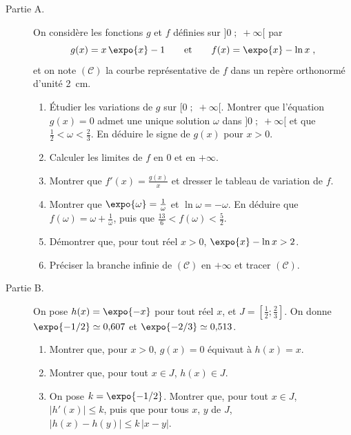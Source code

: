 \begin{exo}
\label{exo:el exp moins ln}
      \begin{description}
            \item[Partie A.]
                On consid\`ere les fonctions $g$ et $f$ d\'efinies sur $]0 \; ; \; +\infty[$ par
                \[ g(x) = x\,\expo{x} - 1 \qquad \text{et} \qquad f(x) = \expo{x} - \ln x \;, \]
                et on note $(\mathcal{C})$ la courbe repr\'esentative de $f$ dans un rep\`ere orthonorm\'e d'unit\'e 2~cm.
                \begin{enumerate}
                \item \'Etudier les variations de $g$ sur $[0 \; ; \; +\infty[$. Montrer que l'\'equation $g(x) = 0$ admet
                      une unique solution $\omega$ dans $]0 \; ; \; +\infty[$ et que $\frac{1}{2} < \omega < \frac{2}{3}$.
                      En d\'eduire le signe de $g(x)$ pour $x > 0$.
                \item Calculer les limites de $f$ en $0$ et en $+\infty$.
                \item Montrer que $f'(x) = \frac{g(x)}{x}$ et dresser le tableau de variation de $f$.
                \item Montrer que $\expo{\omega} = \frac{1}{\omega}$ et $\ln \omega = -\omega$.
                      En d\'eduire que $f(\omega) = \omega + \frac{1}{\omega}$, puis que $\frac{13}{6} < f(\omega) < \frac{5}{2}$.
                \item D\'emontrer que, pour tout r\'eel $x > 0$, $\expo{x} - \ln x > 2$.
                \item Pr\'eciser la branche infinie de $(\mathcal{C})$ en $+\infty$ et tracer $(\mathcal{C})$.
                \end{enumerate}
            \item[Partie B.]
                On pose $h(x) = \expo{-x}$ pour tout r\'eel $x$, et $J = \left[ \frac{1}{2} ; \frac{2}{3} \right]$.
                On donne $\expo{-1/2} \simeq 0{,}607$ et $\expo{-2/3} \simeq 0{,}513$.
                \begin{enumerate}
                \item Montrer que, pour $x > 0$, $g(x) = 0$ \'equivaut \`a $h(x) = x$.
                \item Montrer que, pour tout $x \in J$, $h(x) \in J$.
                \item On pose $k = \expo{-1/2}$. Montrer que, pour tout $x \in J$, $|h'(x)| \leq k$, puis que
                      pour tous $x$, $y$ de $J$, $|h(x) - h(y)| \leq k\,|x - y|$.

\end{enumerate}
\end{description}
\end{exo}
